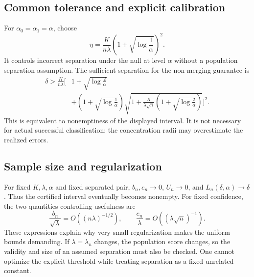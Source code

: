 \documentclass[11pt,a4paper]{article}
\theoremstyle{definition}
\theoremstyle{remark}
\begin{document}
\subsection{Common tolerance and explicit calibration}
For $\alpha_0=\alpha_1=\alpha$, choose
\begin{equation}\label{eq:eta}
 \boxed{\eta=\frac{K}{n\lambda}
       \left(1+\sqrt{\log\frac1\alpha}\right)^2.}
\end{equation}
It controls incorrect separation under the null at level $\alpha$
without a population separation assumption. The sufficient separation
for the non-merging guarantee is
\begin{equation}\label{eq:explicit-delta}
\begin{split}
 \delta>\frac{K}{n\lambda}\Bigg[&1+\sqrt{\log\frac2\alpha}\\
 &+\left(1+\sqrt{\log\frac1\alpha}\right)
 \sqrt{1+\frac{K}{\lambda\sqrt n}
                 \left(1+\sqrt{\log\frac2\alpha}\right)}
 \Bigg]^2.
\end{split}
\end{equation}
This is equivalent to nonemptiness of the displayed interval. It is not
necessary for actual successful classification:
the concentration radii may overestimate the realized errors.

\subsection{Sample size and regularization}
For fixed $K,\lambda,\alpha$ and fixed separated pair,
$b_n,e_n\to0$, $U_n\to0$, and $L_n(\delta,\alpha)\to\delta$.
Thus the certified interval eventually becomes nonempty.
For fixed confidence, the two quantities controlling usefulness are
\[
 \frac{b_n}{\sqrt\lambda}=O((n\lambda)^{-1/2}),\qquad
 \frac{e_n}{\lambda}=O((\lambda\sqrt n)^{-1}).
\]
These expressions explain why very small regularization makes the
uniform bounds demanding. If $\lambda=\lambda_n$ changes, the
population score changes, so the validity and size of an assumed
separation must also be checked. One cannot optimize the explicit
threshold while treating separation as a fixed unrelated constant.
\end{document}
